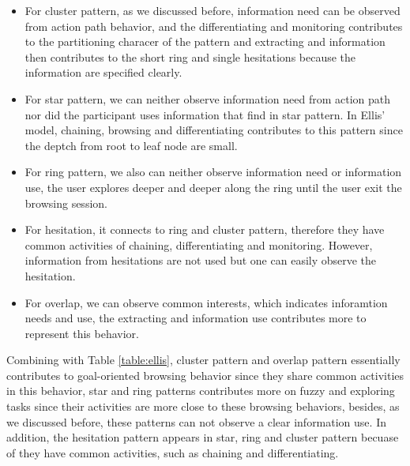 \begin{itemize}
    \item For cluster pattern, as we discussed before, information need can be observed from action path behavior,
    and the differentiating and monitoring contributes to the partitioning characer of the pattern
    and extracting and information then contributes to the short ring and single hesitations
    because the information are specified clearly.
    \item For star pattern, we can neither observe information need from action path nor did the participant uses
    information that find in star pattern. In Ellis' model, chaining, browsing and differentiating contributes to this pattern
    since the deptch from root to leaf node are small.
    \item For ring pattern, we also can neither observe information need or information use, the user explores deeper and deeper
    along the ring until the user exit the browsing session.
    \item For hesitation, it connects to ring and cluster pattern, therefore they have common activities of chaining, differentiating and monitoring.
    However, information from hesitations are not used but one can easily observe the hesitation.
    \item For overlap, we can observe common interests, which indicates inforamtion needs and use, the extracting
    and information use contributes more to represent this behavior.
\end{itemize}

Combining with Table \ref{table:ellis}, cluster pattern and overlap pattern essentially contributes to goal-oriented browsing behavior since they share common
activities in this behavior, star and ring patterns contributes more on fuzzy and exploring tasks since their activities are more close to these browsing behaviors,
besides, as we discussed before, these patterns can not observe a clear information use. 
In addition, the hesitation pattern appears in star, ring and cluster pattern becuase of 
they have common activities, such as chaining and differentiating.

\cleardoublepage